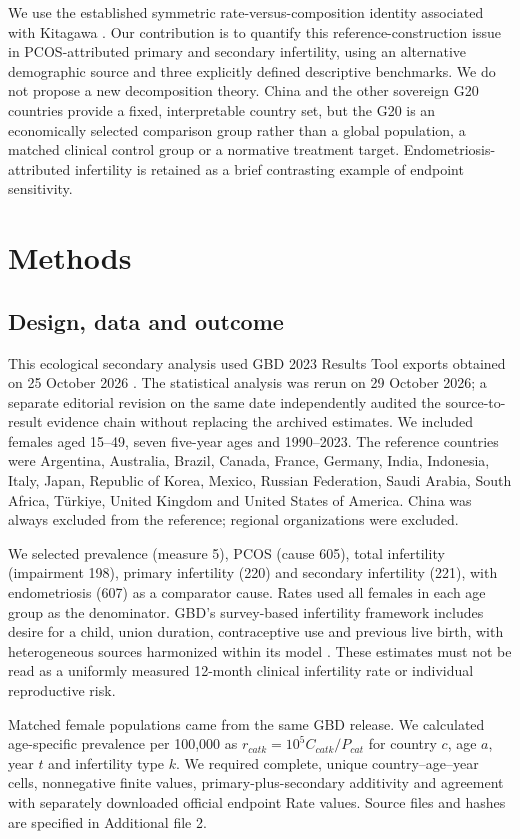 \documentclass[11pt,a4paper]{article}
\begin{document}
We use the established symmetric rate-versus-composition identity associated with Kitagawa \cite{kitagawa}. Our contribution is to quantify this reference-construction issue in PCOS-attributed primary and secondary infertility, using an alternative demographic source and three explicitly defined descriptive benchmarks. We do not propose a new decomposition theory. China and the other sovereign G20 countries provide a fixed, interpretable country set, but the G20 is an economically selected comparison group rather than a global population, a matched clinical control group or a normative treatment target. Endometriosis-attributed infertility is retained as a brief contrasting example of endpoint sensitivity.

\section{Methods}
\subsection{Design, data and outcome}
This ecological secondary analysis used GBD 2023 Results Tool exports obtained on 25 October 2026 \cite{results}. The statistical analysis was rerun on 29 October 2026; a separate editorial revision on the same date independently audited the source-to-result evidence chain without replacing the archived estimates. We included females aged 15--49, seven five-year ages and 1990--2023. The reference countries were Argentina, Australia, Brazil, Canada, France, Germany, India, Indonesia, Italy, Japan, Republic of Korea, Mexico, Russian Federation, Saudi Arabia, South Africa, T\"urkiye, United Kingdom and United States of America. China was always excluded from the reference; regional organizations were excluded.

We selected prevalence (measure 5), PCOS (cause 605), total infertility (impairment 198), primary infertility (220) and secondary infertility (221), with endometriosis (607) as a comparator cause. Rates used all females in each age group as the denominator. GBD's survey-based infertility framework includes desire for a child, union duration, contraceptive use and previous live birth, with heterogeneous sources harmonized within its model \cite{gbd}. These estimates must not be read as a uniformly measured 12-month clinical infertility rate or individual reproductive risk.

Matched female populations came from the same GBD release. We calculated age-specific prevalence per 100,000 as $r_{catk}=10^5 C_{catk}/P_{cat}$ for country $c$, age $a$, year $t$ and infertility type $k$. We required complete, unique country--age--year cells, nonnegative finite values, primary-plus-secondary additivity and agreement with separately downloaded official endpoint Rate values. Source files and hashes are specified in Additional file 2.
\end{document}
